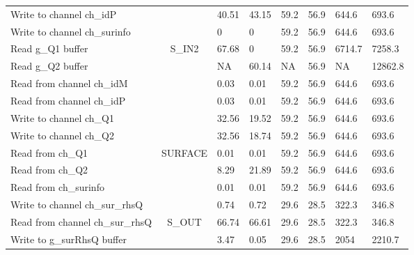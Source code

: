\begin{table}[]
{\begin{tabular}{|l|c|l|l|l|l|l|l|}
  Write to channel ch\_idP &  & 40.51 & 43.15 & 59.2 & 56.9 & 644.6 & 693.6 \\ \cline{1-1} \cline{3-8}
  Write to channel ch\_surinfo &  & 0 & 0 & 59.2 & 56.9 & 644.6 & 693.6 \\ \hline
  Read g\_Q1 buffer & \multirow{6}{*}{S\_IN2} & 67.68 & 0 & 59.2 & 56.9 & 6714.7 & 7258.3 \\ \cline{1-1} \cline{3-8}
  Read g\_Q2 buffer &  & NA & 60.14 & NA & 56.9 & NA & 12862.8 \\ \cline{1-1} \cline{3-8}
  Read from channel ch\_idM &  & 0.03 & 0.01 & 59.2 & 56.9 & 644.6 & 693.6 \\ \cline{1-1} \cline{3-8}
  Read from channel ch\_idP &  & 0.03 & 0.01 & 59.2 & 56.9 & 644.6 & 693.6 \\ \cline{1-1} \cline{3-8}
  Write to channel ch\_Q1 &  & 32.56 & 19.52 & 59.2 & 56.9 & 644.6 & 693.6 \\ \cline{1-1} \cline{3-8}
  Write to channel ch\_Q2 &  & 32.56 & 18.74 & 59.2 & 56.9 & 644.6 & 693.6 \\ \hline
  Read from ch\_Q1 & \multirow{4}{*}{SURFACE} & 0.01 & 0.01 & 59.2 & 56.9 & 644.6 & 693.6 \\ \cline{1-1} \cline{3-8}
  Read from  ch\_Q2 &  & 8.29 & 21.89 & 59.2 & 56.9 & 644.6 & 693.6 \\ \cline{1-1} \cline{3-8}
  Read from ch\_surinfo &  & 0.01 & 0.01 & 59.2 & 56.9 & 644.6 & 693.6 \\ \cline{1-1} \cline{3-8}
  Write to channel ch\_sur\_rhsQ &  & 0.74 & 0.72 & 29.6 & 28.5 & 322.3 & 346.8 \\ \hline
  Read from channel ch\_sur\_rhsQ & \multirow{2}{*}{S\_OUT} & 66.74 & 66.61 & 29.6 & 28.5 & 322.3 & 346.8 \\ \cline{1-1} \cline{3-8}
  Write to g\_surRhsQ buffer &  & 3.47 & 0.05 & 29.6 & 28.5 & 2054 & 2210.7 \\ \hline
  \end{tabular}%
  }
\end{table}


